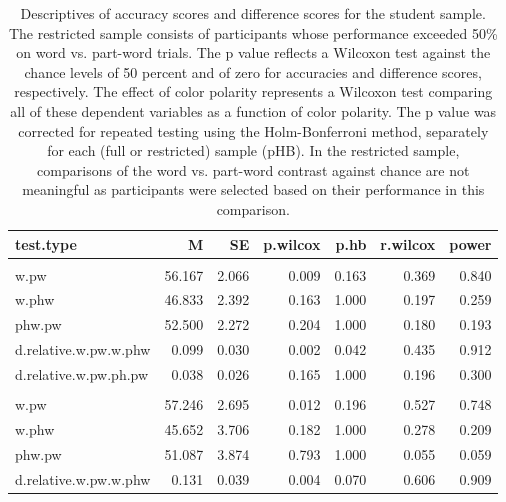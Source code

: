 \documentclass[
]{article}
\begin{document}
\begin{longtable}[t]{lrrrrrr}
\caption{\label{tab:vsl-simultaneous-fa-descriptives-print-city}Descriptives of accuracy scores and difference scores for the student sample. The restricted sample consists of participants whose performance exceeded 50\% on word vs. part-word trials. The p value reflects a Wilcoxon test against the chance levels of 50 percent and of zero for accuracies and difference scores, respectively. The effect of color polarity represents a Wilcoxon test comparing all of these dependent variables as a function of color polarity. The p value was corrected for repeated testing using the Holm-Bonferroni method, separately for each (full or restricted) sample (pHB). In the restricted sample, comparisons of the word vs. part-word contrast against chance are not meaningful as participants were selected based on their performance in this comparison.}\\
\toprule
test.type & M & SE & p.wilcox & p.hb & r.wilcox & power\\
\midrule
\addlinespace[0.3em]
\multicolumn{7}{l}{\textbf{Full sample - Zcombined (N = 50)}}\\
\hspace{1em}w.pw & 56.167 & 2.066 & 0.009 & 0.163 & 0.369 & 0.840\\
\hspace{1em}w.phw & 46.833 & 2.392 & 0.163 & 1.000 & 0.197 & 0.259\\
\hspace{1em}phw.pw & 52.500 & 2.272 & 0.204 & 1.000 & 0.180 & 0.193\\
\hspace{1em}d.relative.w.pw.w.phw & 0.099 & 0.030 & 0.002 & 0.042 & 0.435 & 0.912\\
\hspace{1em}d.relative.w.pw.ph.pw & 0.038 & 0.026 & 0.165 & 1.000 & 0.196 & 0.300\\
\addlinespace[0.3em]
\multicolumn{7}{l}{\textbf{Full sample - black.on.white (N = 23)}}\\
\hspace{1em}w.pw & 57.246 & 2.695 & 0.012 & 0.196 & 0.527 & 0.748\\
\hspace{1em}w.phw & 45.652 & 3.706 & 0.182 & 1.000 & 0.278 & 0.209\\
\hspace{1em}phw.pw & 51.087 & 3.874 & 0.793 & 1.000 & 0.055 & 0.059\\
\hspace{1em}d.relative.w.pw.w.phw & 0.131 & 0.039 & 0.004 & 0.070 & 0.606 & 0.909\\

\end{longtable}
\end{document}
